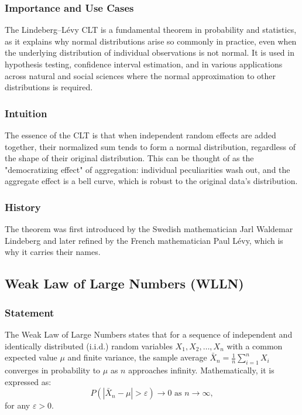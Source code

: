 \documentclass{article}
\begin{document}
\subsubsection{Importance and Use Cases}
The Lindeberg–Lévy CLT is a fundamental theorem in probability and statistics, as it explains why normal distributions arise so commonly in practice, even when the underlying distribution of individual observations is not normal. It is used in hypothesis testing, confidence interval estimation, and in various applications across natural and social sciences where the normal approximation to other distributions is required.
\subsubsection{Intuition}
The essence of the CLT is that when independent random effects are added together, their normalized sum tends to form a normal distribution, regardless of the shape of their original distribution. This can be thought of as the "democratizing effect" of aggregation: individual peculiarities wash out, and the aggregate effect is a bell curve, which is robust to the original data's distribution.

\subsubsection{History}
The theorem was first introduced by the Swedish mathematician Jarl Waldemar Lindeberg and later refined by the French mathematician Paul Lévy, which is why it carries their names.

\subsection{Weak Law of Large Numbers (WLLN)}

\subsubsection{Statement}
The Weak Law of Large Numbers states that for a sequence of independent and identically distributed (i.i.d.) random variables \( X_1, X_2, \ldots, X_n \) with a common expected value \( \mu \) and finite variance, the sample average \( \bar{X}_n = \frac{1}{n}\sum_{i=1}^{n}X_i \) converges in probability to \( \mu \) as \( n \) approaches infinity. Mathematically, it is expressed as:
\[ P\left(\left|\bar{X}_n - \mu\right| > \varepsilon\right) \rightarrow 0 \text{ as } n \rightarrow \infty, \]
for any \( \varepsilon > 0 \). 
\end{document}
